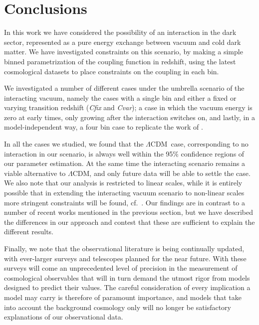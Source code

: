 \documentclass[a4paper,fleqn,usenatbib]{mnras}
\newcommand*{\LCDM}{$\Lambda$CDM}
\begin{document}
\section{Conclusions} \label{sec:conclusions}
In this work we have considered the possibility of an interaction in the dark sector, represented as a pure energy exchange between vacuum and cold dark matter. We have investigated constraints on this scenario, by making a simple binned parametrization of the coupling function in redshift, using the latest cosmological datasets to place constraints on the coupling in each bin.

We investigated a number of different cases under the umbrella scenario of the interacting vacuum, namely the cases with a single bin and either a fixed or varying transition redshift (\textit{Cfix} and \textit{Cvar}); a case in which the vacuum energy is zero at early times, only growing after the interaction switches on, and lastly, in a model-independent way, a four bin case to replicate the work of \cite{Salvatelli2014}.

In all the cases we studied, we found that the \LCDM~case, corresponding to no interaction in our scenario, is always well within the 95\% confidence regions of our parameter estimation. At the same time the interacting scenario remains a viable alternative to $\Lambda$CDM, and only future data will be able to settle the case. We also note that our analysis is restricted to linear scales, while it is entirely possible that in extending the interacting vacuum scenario to non-linear scales more stringent constraints will be found, cf.\ \cite{He:2018oai}. Our findings are in contrast to a number of recent works mentioned in the previous section, but we have described the differences in our approach and contest that these  are sufficient to explain the different results.

Finally, we note that the observational literature is being continually updated, with ever-larger surveys and telescopes planned for the near future. With these surveys will come an unprecedented level of precision in the measurement of cosmological observables that will in turn demand the utmost rigor from models designed to predict their values. The careful consideration of every implication a model may carry is therefore of paramount importance, and models that take into account the background cosmology only will no longer be satisfactory explanations of our observational data.
\end{document}
